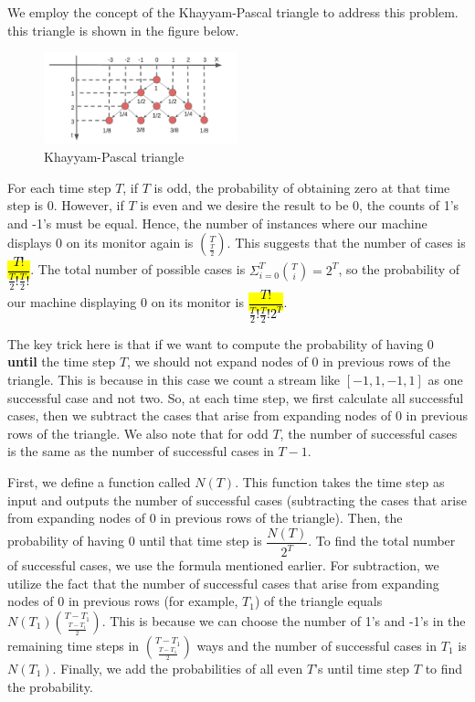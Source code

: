 \begin{qsolve}
	\begin{qsolve}[]
		We employ the concept of the Khayyam-Pascal triangle to address this problem. this triangle is shown in the figure below.
		\begin{figure}[H]
			\centering
			\includegraphics[width=0.5\textwidth]{khayyam_pascal_triangle.png}
			\caption{Khayyam-Pascal triangle}
		\end{figure}

		 For each time step $T$, if $T$ is odd, the probability of obtaining zero at that time step is $0$. However, if $T$ is even and we desire the result to be $0$, the counts of 1’s and -1’s must be equal. Hence, the number of instances where our machine displays 0 on its monitor again is $\binom{T}{\frac{T}{2}}$. This suggests that the number of cases is \hl{$\dfrac{T!}{\frac{T}{2}!\frac{T}{2}!}$}. The total number of possible cases is $\Sigma_{i=0}^T \binom{T}{i} = 2^T$, so the probability of our machine displaying 0 on its monitor is \hl{$\dfrac{T!}{\frac{T}{2}!\frac{T}{2}!2^T}$}.
	\splitqsolve[\splitqsolve]
	
	
		The key trick here is that if we want to compute the probability of having 0 \textbf{until} the time step $T$, we should not expand nodes of 0 in previous rows of the triangle. This is because in this case we count a stream like $[-1,1,-1,1]$ as one successful case and not two. So, at each time step, we first calculate all successful cases, then we subtract the cases that arise from expanding nodes of 0 in previous rows of the triangle. We also note that for odd $T$, the number of successful cases is the same as the number of successful cases in $T-1$. 
		
		First, we define a function called $N(T)$. This function takes the time step as input and outputs the number of successful cases (subtracting the cases that arise from expanding nodes of 0 in previous rows of the triangle). Then, the probability of having $0$ until that time step is $\dfrac{N(T)}{2^T}$. To find the total number of successful cases, we use the formula mentioned earlier. For subtraction, we utilize the fact that the number of successful cases that arise from expanding nodes of 0 in previous rows (for example, $T_1$) of the triangle equals $N(T_1)\binom{T-T_1}{\frac{T-T_1}{2}}$. This is because we can choose the number of 1's and -1's in the remaining time steps in $\binom{T-T_1}{\frac{T-T_1}{2}}$ ways and the number of successful cases in $T_1$ is $N(T_1)$. Finally, we add the probabilities of all even $T$'s until time step $T$ to find the probability. 
	


\end{qsolve}
\end{qsolve}
